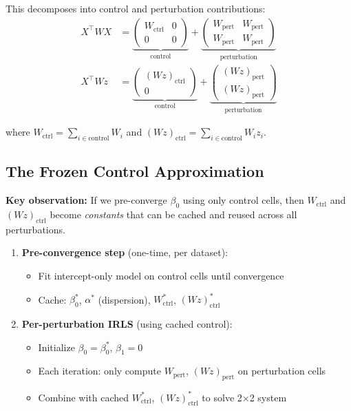 \documentclass{article}
\begin{document}
This decomposes into control and perturbation contributions:
\begin{align}
    X^\top W X &= \underbrace{\begin{pmatrix} W_{\text{ctrl}} & 0 \\ 0 & 0 \end{pmatrix}}_{\text{control}} + \underbrace{\begin{pmatrix} W_{\text{pert}} & W_{\text{pert}} \\ W_{\text{pert}} & W_{\text{pert}} \end{pmatrix}}_{\text{perturbation}} \\
    X^\top W z &= \underbrace{\begin{pmatrix} (Wz)_{\text{ctrl}} \\ 0 \end{pmatrix}}_{\text{control}} + \underbrace{\begin{pmatrix} (Wz)_{\text{pert}} \\ (Wz)_{\text{pert}} \end{pmatrix}}_{\text{perturbation}}
\end{align}

where $W_{\text{ctrl}} = \sum_{i \in \text{control}} W_i$ and $(Wz)_{\text{ctrl}} = \sum_{i \in \text{control}} W_i z_i$.

\subsection{The Frozen Control Approximation}

\textbf{Key observation:} If we pre-converge $\beta_0$ using only control cells, then $W_{\text{ctrl}}$ and $(Wz)_{\text{ctrl}}$ become \emph{constants} that can be cached and reused across all perturbations.

\begin{enumerate}
    \item \textbf{Pre-convergence step} (one-time, per dataset):
    \begin{itemize}
        \item Fit intercept-only model on control cells until convergence
        \item Cache: $\beta_0^*$, $\alpha^*$ (dispersion), $W_{\text{ctrl}}^*$, $(Wz)_{\text{ctrl}}^*$
    \end{itemize}
    
    \item \textbf{Per-perturbation IRLS} (using cached control):
    \begin{itemize}
        \item Initialize $\beta_0 = \beta_0^*$, $\beta_1 = 0$
        \item Each iteration: only compute $W_{\text{pert}}$, $(Wz)_{\text{pert}}$ on perturbation cells
        \item Combine with cached $W_{\text{ctrl}}^*$, $(Wz)_{\text{ctrl}}^*$ to solve 2×2 system
    \end{itemize}
\end{enumerate}
\end{document}
